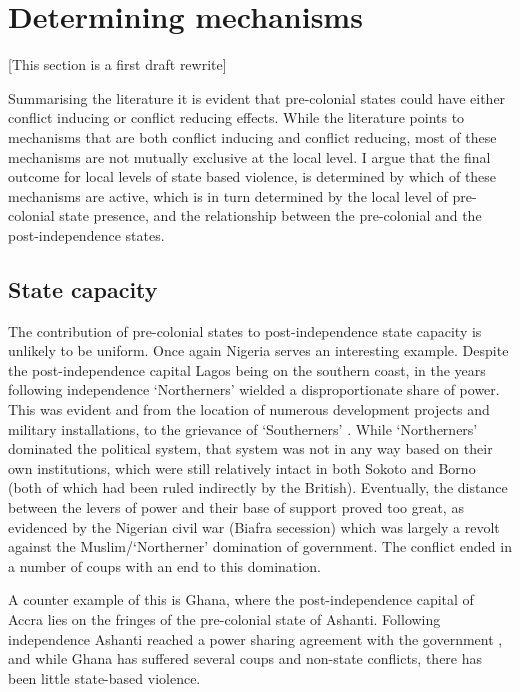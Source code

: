 \documentclass[12pt]{article}
\begin{document}
\section{Determining mechanisms} \label{Determining mechanisms} 

[This section is a first draft rewrite]

Summarising the literature it is evident that pre-colonial states could have
either conflict inducing or conflict reducing effects. While the literature
points to mechanisms that are both conflict inducing and conflict reducing, most
of these mechanisms are not mutually exclusive at the local level. I argue that
the final outcome for local levels of state based violence, is determined by
which of these mechanisms are active, which is in turn determined by the local
level of pre-colonial state presence, and the relationship between the
pre-colonial and the post-independence states.

\subsection{State capacity} \label{State capacity}

The contribution of pre-colonial states to post-independence state capacity is
unlikely to be uniform. Once again Nigeria serves an interesting example.
Despite the post-independence capital Lagos being on the southern coast, in the
years following independence `Northerners' wielded a disproportionate share of
power. This was evident and from the location of numerous development projects
and military installations, to the grievance of `Southerners'
\citep{Bates2008a}. While `Northerners' dominated the political system, that
system was not in any way based on their own institutions, which were still
relatively intact in both Sokoto and Borno (both of which had been ruled
indirectly by the British). Eventually, the distance between the levers of power
and their base of support proved too great, as evidenced by the Nigerian civil
war (Biafra secession) which was largely a revolt against the
Muslim/`Northerner' domination of government. The conflict ended in a number of
coups with an end to this domination. 

A counter example of this is Ghana, where the post-independence capital of Accra
lies on the fringes of the pre-colonial state of Ashanti. Following independence
Ashanti reached a power sharing agreement with the government
\citep{Apter_1960}, and while Ghana has suffered several coups and non-state
conflicts, there has been little state-based violence.
\end{document}
